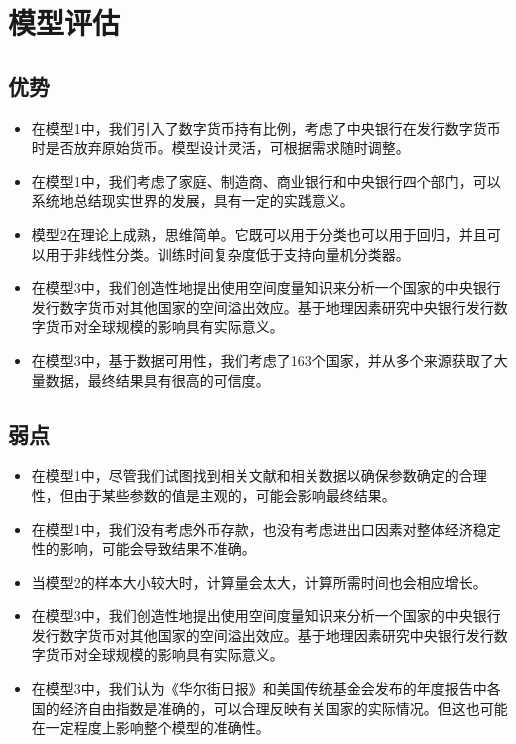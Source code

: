 \documentclass[withoutpreface,bwprint]{cumcmthesis} %
\begin{document}
\section{模型评估}

\subsection{优势}
\begin{itemize}
	\item 在模型1中，我们引入了数字货币持有比例，考虑了中央银行在发行数字货币时是否放弃原始货币。模型设计灵活，可根据需求随时调整。
	\item 在模型1中，我们考虑了家庭、制造商、商业银行和中央银行四个部门，可以系统地总结现实世界的发展，具有一定的实践意义。
	\item 模型2在理论上成熟，思维简单。它既可以用于分类也可以用于回归，并且可以用于非线性分类。训练时间复杂度低于支持向量机分类器。
	\item 在模型3中，我们创造性地提出使用空间度量知识来分析一个国家的中央银行发行数字货币对其他国家的空间溢出效应。基于地理因素研究中央银行发行数字货币对全球规模的影响具有实际意义。
	\item 在模型3中，基于数据可用性，我们考虑了163个国家，并从多个来源获取了大量数据，最终结果具有很高的可信度。
\end{itemize}

\subsection{弱点}
\begin{itemize}
	\item 在模型1中，尽管我们试图找到相关文献和相关数据以确保参数确定的合理性，但由于某些参数的值是主观的，可能会影响最终结果。
	\item 在模型1中，我们没有考虑外币存款，也没有考虑进出口因素对整体经济稳定性的影响，可能会导致结果不准确。
	\item 当模型2的样本大小较大时，计算量会太大，计算所需时间也会相应增长。
	\item 在模型3中，我们创造性地提出使用空间度量知识来分析一个国家的中央银行发行数字货币对其他国家的空间溢出效应。基于地理因素研究中央银行发行数字货币对全球规模的影响具有实际意义。
	\item 在模型3中，我们认为《华尔街日报》和美国传统基金会发布的年度报告中各国的经济自由指数是准确的，可以合理反映有关国家的实际情况。但这也可能在一定程度上影响整个模型的准确性。
\end{itemize}
\end{document}
